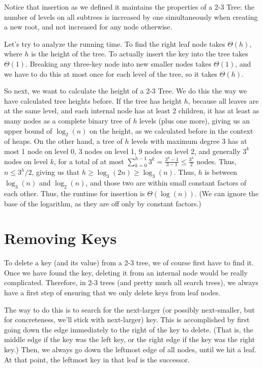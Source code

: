 Notice that insertion as we defined it maintains the properties of a
2-3 Tree: the number of levels on all subtrees is increased by one
simultaneously when creating a new root, and not increased for any node
otherwise. 

Let's try to analyze the running time. To find the right leaf node
takes $\Theta(h)$, where $h$ is the height of the tree.
To actually insert the key into the tree takes $\Theta(1)$.
Breaking any three-key node into new smaller nodes takes $\Theta(1)$,
and we have to do this at most once for each level of the tree, so it
takes $\Theta(h)$.

So next, we want to calculate the height of a 2-3 Tree. We do this the
way we have calculated tree heights before.
If the tree has height $h$, because all leaves are at the same level,
and each internal node has at least 2 children, it has at least as
many nodes as a complete binary tree of $h$ levels (plus one more),
giving us an upper bound of $\log_2(n)$ on the height, as we
calculated before in the context of heaps.
On the other hand, a tree of $h$ levels with maximum degree 3 has at
most 1 node on level 0, 3 nodes on level 1, 9 nodes on level 2, and
generally $3^k$ nodes on level $k$, for a total of at most
$\sum_{k=0}^{h-1} 3^k = \frac{3^h-1}{3-1} \leq \frac{3^h}{2}$ nodes.
Thus, $n \leq 3^h/2$, giving us that $h \geq \log_3(2n) \geq \log_3(n)$.
Thus, $h$ is between $\log_3(n)$ and $\log_2(n)$, and those two are
within small constant factors of each other.
Thus, the runtime for insertion is $\Theta(\log (n))$.
(We can ignore the base of the logarithm, as they are off only by
constant factors.)

\section{Removing Keys}
To delete a key (and its value) from a 2-3 tree, we of course first
have to find it. Once we have found the key, deleting it from an
internal node would be really complicated. Therefore, in 2-3 trees
(and pretty much all search trees), we always have a first step of
ensuring that we only delete keys from leaf nodes.

The way to do this is to search for the next-larger (or possibly
next-smaller, but for concreteness, we'll stick with next-larger)
key. This is accomplished by first going down the edge immediately to
the right of the key to delete. (That is, the middle edge if the key
was the left key, or the right edge if the key was the right key.)
Then, we always go down the leftmost edge of all nodes, until we hit a
leaf. At that point, the leftmost key in that leaf is the successor.

